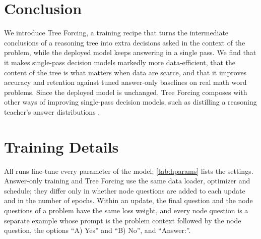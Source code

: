 \documentclass{article}
\newcommand{\tf}{Tree Forcing}
\begin{document}
\section{Conclusion}

We introduce \tf{}, a training recipe that turns the intermediate conclusions of a reasoning tree into extra decisions
asked in the context of the problem, while the deployed model keeps answering in a single pass. We find that it makes
single-pass decision models markedly more data-efficient, that the content of the tree is what matters when data are
scarce, and that it improves accuracy and retention against tuned answer-only baselines on real math word problems.
Since the deployed model is unchanged, \tf{} composes with other ways of improving single-pass decision models, such as
distilling a reasoning teacher's answer distributions \citep{ldm2026}.




\newpage
\appendix
\onecolumn

\section{Training Details}
\label{app:hparams}

All runs fine-tune every parameter of the model; \cref{tab:hparams} lists the settings. Answer-only training and \tf{}
use the same data loader, optimizer and schedule; they differ only in whether node questions are added to each update
and in the number of epochs. Within an update, the final question and the node questions of a problem have the same
loss weight, and every node question is a separate example whose prompt is the problem context followed by the node
question, the options ``A) Yes'' and ``B) No'', and ``Answer:''.
\end{document}
